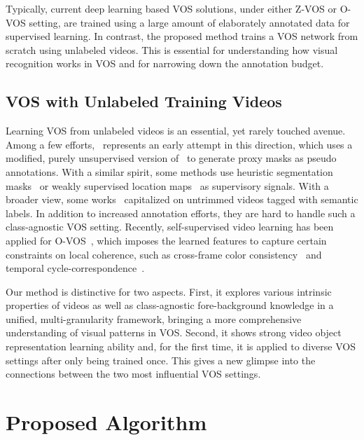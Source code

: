 \documentclass[10pt,twocolumn,letterpaper]{article}
\begin{document}
Typically, current deep learning based VOS solutions, under either Z-VOS or O-VOS setting, are trained using a large amount of elaborately annotated data for supervised learning.
In contrast, the proposed method trains a VOS network from scratch using unlabeled videos.  This is essential
for understanding how visual recognition works in VOS and for narrowing down the annotation budget.




\vspace{-0pt}
\subsection{VOS with Unlabeled Training Videos}
\label{sec:wvos}
\vspace{-1pt}
Learning VOS from unlabeled videos is an essential, yet rarely touched avenue. Among a few efforts,~\cite{pathak2017learning} represents an early attempt in this direction, which uses a modified, purely unsupervised version of~\cite{DBLP:conf/bmvc/FaktorI14} to generate proxy masks as pseudo annotations. With a similar spirit, some methods use heuristic segmentation masks~\cite{croitoru2017unsupervised} or weakly supervised location maps~\!\cite{Lee2019FrametoFrameAO} as supervisory signals. With a broader view, some works~\!\cite{Tang_2013_CVPR,hartmann2012weakly,Zhang_2017_CVPR} capitalized on untrimmed videos tagged with semantic labels. In addition to increased annotation efforts, they are hard to handle such a class-agnostic VOS setting. Recently, self-supervised video learning has been applied for O-VOS~\!\cite{vondrick2018tracking,CVPR2019_CycleTime}, which imposes the learned features to capture certain constraints on local coherence, such as cross-frame color consistency~\!\cite{vondrick2018tracking} and temporal cycle-correspondence~\!\cite{CVPR2019_CycleTime}.

Our method is distinctive for two aspects. First, it explores various intrinsic properties of videos as well as class-agnostic fore-background knowledge in a unified, multi-granularity framework, bringing a more comprehensive understanding of visual patterns in VOS. Second, it shows strong video object representation learning ability and, for the first time, it is applied to diverse VOS settings after only being trained once. This gives a new glimpse into the connections between the two most influential VOS settings.

\vspace{-2pt}
\section{Proposed Algorithm}
\vspace{-2pt}
\end{document}
